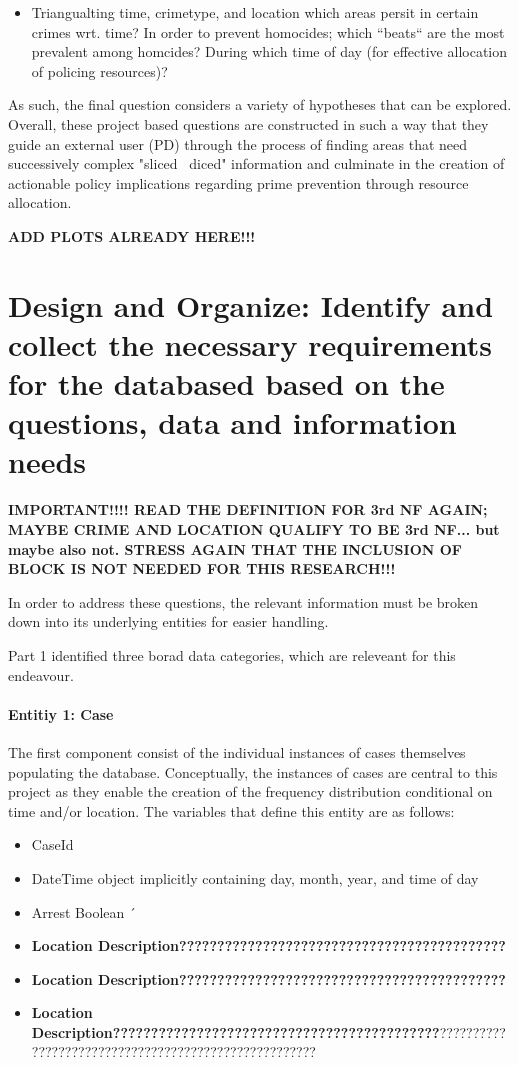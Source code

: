 \documentclass[a4paper]{article}
\begin{document}
\begin{itemize}
  \item Triangualting time, crimetype, and location which areas persit in certain crimes wrt. time?
In order to prevent homocides; which “beats“ are the most prevalent among homcides? During which time of day (for effective allocation of policing resources)? 

\end{itemize}

As such, the final question considers a variety of hypotheses that can be explored. Overall, these project based questions are constructed in such a way that they guide an external user (PD) through the process of finding areas that need successively complex "sliced \ diced" information and culminate in the creation of actionable policy implications regarding prime prevention through resource allocation.


\textbf{ADD PLOTS ALREADY HERE!!!}


\section{Design and Organize: Identify and collect the necessary requirements for the databased based on the questions, data and information needs}

\textbf{IMPORTANT!!!! READ THE DEFINITION FOR 3rd NF AGAIN; MAYBE CRIME AND LOCATION QUALIFY TO BE 3rd NF... but maybe also not. STRESS AGAIN THAT THE INCLUSION OF BLOCK IS NOT NEEDED FOR THIS RESEARCH!!!}

In order to address these questions, the relevant information must be broken down into its underlying entities for easier handling. 

Part 1 identified three borad data categories, which are releveant for this endeavour. 
\paragraph{Entitiy 1: Case} The first component consist of the individual instances of cases themselves populating the database. Conceptually, the instances of cases are central to this project as they enable the creation of the frequency distribution conditional on time and/or location. The variables that define this entity are as follows:

\begin{itemize}
  \item CaseId
  \item DateTime object implicitly containing day, month, year, and time of day 
  \item Arrest Boolean  
´  \item \textbf{Location Description???????????????????????????????????????????}
\item \textbf{Location Description???????????????????????????????????????????}
\item \textbf{Location Description???????????????????????????????????????????}?????????????????????????????????????????????????????
\end{itemize}
 
\end{document}
